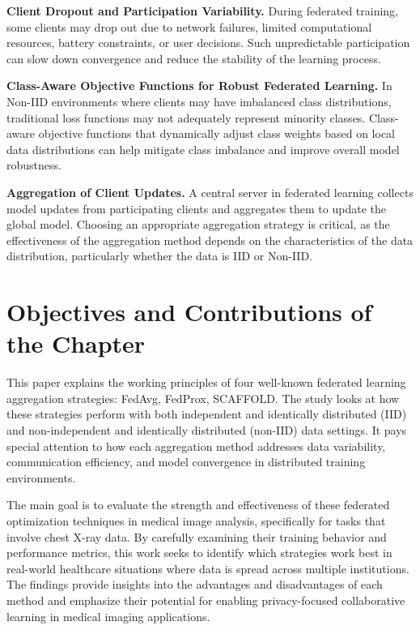 \documentclass[12pt]{book}
\begin{document}
\textbf{Client Dropout and Participation Variability.}  
During federated training, some clients may drop out due to network failures, limited computational resources, battery constraints, or user decisions. Such unpredictable participation can slow down convergence and reduce the stability of the learning process.

\textbf{Class-Aware Objective Functions for Robust Federated Learning.}  
In Non-IID environments where clients may have imbalanced class distributions, traditional loss functions may not adequately represent minority classes. Class-aware objective functions that dynamically adjust class weights based on local data distributions can help mitigate class imbalance and improve overall model robustness.

\textbf{Aggregation of Client Updates.}  
A central server in federated learning collects model updates from participating clients and aggregates them to update the global model. Choosing an appropriate aggregation strategy is critical, as the effectiveness of the aggregation method depends on the characteristics of the data distribution, particularly whether the data is IID or Non-IID.

\section{Objectives and Contributions of the Chapter}

This paper explains the working principles of four well-known federated learning aggregation strategies: FedAvg, FedProx, SCAFFOLD. The study looks at how these strategies perform with both independent and identically distributed (IID) and non-independent and identically distributed (non-IID) data settings. It pays special attention to how each aggregation method addresses data variability, communication efficiency, and model convergence in distributed training environments.

The main goal is to evaluate the strength and effectiveness of these federated optimization techniques in medical image analysis, specifically for tasks that involve chest X-ray data. By carefully examining their training behavior and performance metrics, this work seeks to identify which strategies work best in real-world healthcare situations where data is spread across multiple institutions. The findings provide insights into the advantages and disadvantages of each method and emphasize their potential for enabling privacy-focused collaborative learning in medical imaging applications.
\end{document}
